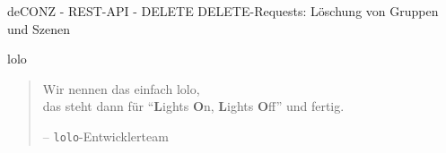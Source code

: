\begin{frame}{deCONZ - REST-API - DELETE}
  \Large
  DELETE-Requests: Löschung
  \flushleft
  von Gruppen und Szenen
\end{frame}

\begin{frame}{}
  \begin{center}
    \vspace{-0.2cm}
    \label{fig:matrix}
  \end{center}
\end{frame}

\begin{frame}{lolo}
  \Large
  \begin{quote}
    Wir nennen das einfach \alert{lolo},\\
    das steht dann für ``\textbf Lights \textbf On, \textbf Lights \textbf Off''
    und fertig.
    \begin{flushright}
      \small
      -- \texttt{lolo}-Entwicklerteam
    \end{flushright}
  \end{quote}
\end{frame}

